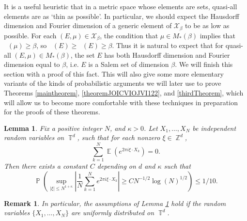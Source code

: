 \documentclass[dvipsnames,letterpaper,12pt]{article}
\numberwithin{equation}{section}
\DeclareMathOperator{\hausdim}{\dim_{\mathbb{H}}}
\DeclareMathOperator{\fordim}{\dim_{\mathbb{F}}}
\DeclareMathOperator{\ZZ}{\mathbb{Z}}
\DeclareMathOperator{\TT}{\mathbb{T}}
\newtheorem{lemma}[theorem]{Lemma}
\newtheorem{remark}[theorem]{Remark}
\numberwithin{theorem}{section}
\DeclareMathOperator{\EE}{\mathbb{E}}
\DeclareMathOperator{\PP}{\mathbb{P}}
\begin{document}
It is a useful heuristic that in a metric space whose elements are sets, quasi-all elements are as `thin as possible'. In particular, we should expect the Hausdorff dimension and Fourier dimension of a generic element of $\mathcal{X}_\beta$ to be as low as possible. For each $(E,\mu) \in \mathcal{X}_\beta$, the condition that $\mu \in M_*(\beta)$ implies that $\fordim(\mu) \geq \beta$, so $\hausdim(E) \geq \fordim(E) \geq \beta$. Thus it is natural to expect that for quasi-all $(E,\mu) \in M_*(\beta)$, the set $E$ has both Hausdorff dimension and Fourier dimension equal to $\beta$, i.e. $E$ is a Salem set of dimension $\beta$. We will finish this section with a proof of this fact. This will also give some more elementary variants of the kinds of probabilistic arguments we will later use to prove Theorems \ref{maintheorem}, \ref{theoremJOICVIOJVI122}, and \ref{thirdTheorem}, which will allow us to become more comfortable with these techniques in preparation for the proofs of these theorems.

\begin{lemma} \label{LemmaGISCICS1}
    Fix a positive integer $N$, and $\kappa > 0$. Let $X_1, \dots, X_N$ be independent random variables on $\TT^d$, such that for each nonzero $\xi \in \ZZ^d$,
    \begin{equation} \label{equatioNVVVVSXXJVU1132}
        \sum_{k = 1}^N \EE \left( e^{2 \pi i \xi \cdot X_k} \right) = 0.
    \end{equation}
    Then there exists a constant $C$ depending on $d$ and $\kappa$ such that
    \[ \PP \left( \sup_{|\xi| \leq N^{1 + \kappa}} \left| \frac{1}{N} \sum_{k = 1}^N e^{2 \pi i \xi \cdot X_k} \right| \geq C N^{-1/2} \log(N)^{1/2} \right) \leq 1/10. \]
\end{lemma}

\begin{remark}
    In particular, the assumptions of Lemma \ref{LemmaGISCICS1} hold if the random variables $\{ X_1,\dots, X_N \}$ are uniformly distributed on $\TT^d$.
\end{remark}
\end{document}

